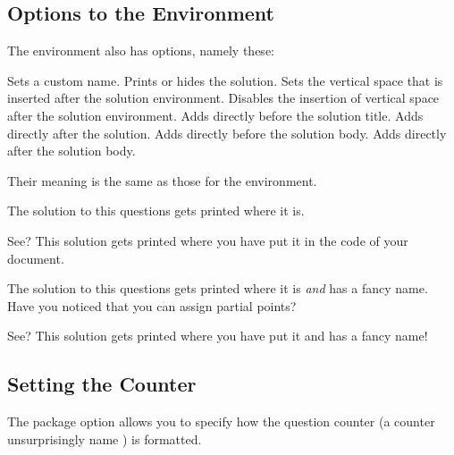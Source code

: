 \documentclass[load-preamble+]{cnltx-doc}
\begin{document}
\subsection{Options to the  Environment}\label{sec:opti-soli-envir}
The  environment also has options, namely these:
\begin{options}
  \Default
    Sets a custom name.
    Prints or hides the solution.
    Sets the vertical space that is inserted after the
    solution environment.
    Disables the insertion of vertical space after the
    solution environment.
  \Default
    Adds  directly before the solution title.
  \Default
    Adds  directly after the solution.
  \Default
    Adds  directly before the solution body.
  \Default
    Adds  directly after the solution body.
\end{options}
Their meaning is the same as those for the  environment.
\begin{example}
  \begin{question}{5}
    The solution to this questions gets printed where it is.
  \end{question}
  \begin{solution}[print]
    See? This solution gets printed where you have put it in the code of
    your document.
  \end{solution}
  \begin{question}{2.5}
    The solution to this questions gets printed where it is \emph{and}
    has a fancy name. Have you noticed that you can assign partial
    points?
  \end{question}
  \begin{solution}[print,name=Fancy name]
    See? This solution gets printed where you have put it and has a fancy
    name!
  \end{solution}
\end{example}

\subsection{Setting the Counter}\label{ssec:counter}
The package option  allows you to specify how the question
counter (a counter unsurprisingly name ) is formatted.
\end{document}
